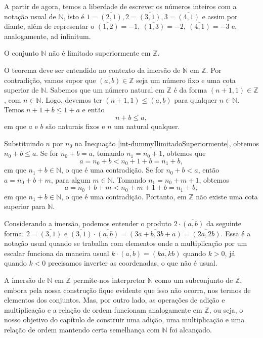\documentclass[../main.tex]{subfiles}
\begin{document}
\begin{obs}
    A partir de agora, temos a liberdade de escrever os números inteiros com a notação usual de $\mathbb{N}$, isto é $1 = \overline{(2,1)}, 2 = \overline{(3,1)}, 3 = \overline{(4,1)}$ e assim por diante, além de representar o $\overline{(1,2)} = -1,\ \overline{(1,3)} = -2,\ \overline{(4,1)} = -3$ e, analogamente, ad infinitum.
\end{obs}

\begin{teo}\label{int-teo-ilimitadoSuperiormente}
    O conjunto $\mathbb{N}$ não é limitado superiormente em $\mathbb{Z}$.
\end{teo}
\begin{dem}
    O teorema deve ser entendido no contexto da imersão de $\mathbb{N}$ em $\mathbb{Z}$.
    Por contradição, vamos supor que $\overline{(a,b)} \in \mathbb{Z}$ seja um número fixo e uma cota superior de $\mathbb{N}$. Sabemos que um número natural em $\mathbb{Z}$ é da forma $\overline{(n+1,1)} \in \mathbb{Z}$, com $n \in \mathbb{N}$. Logo, devemos ter $\overline{(n+1,1)} \leq \overline{(a,b)}$ para qualquer $n \in \mathbb{N}$. Temos $n+1+b \leq 1+a$ e então
    \begin{equation}
        n+b \leq a, \label{int-dummyIlimitadoSuperiormente}     
    \end{equation}
    em que $a$ e $b$ são naturais fixos e $n$ um natural qualquer.
    
    Substituindo $n$ por $n_0$ na Inequação \ref{int-dummyIlimitadoSuperiormente}, obtemos $n_0 + b \leq a$. Se for $n_0 + b = a$, tomando $n_1 = n_0 + 1$, obtemos que 
    \[ a = n_0 + b < n_0 + 1 + b =  n_1 + b, \] 
    em que $n_1 + b \in \mathbb{N}$, o que é uma contradição. Se for 
    $n_0 + b < a$, então $a = n_0 + b + m$, para algum $m \in \mathbb{N}$. Tomando $n_1 = n_0 + m + 1$, obtemos 
    \[ a = n_0 + b + m < n_0+m+1 + b = n_1 + b, \] 
    em que $n_1 + b \in \mathbb{N}$, o que é uma contradição. Portanto, em $\mathbb{Z}$ não existe uma cota superior para $\mathbb{N}$.

\end{dem}

\begin{ex}\label{int-ex-imersaoProduto}
    Considerando a imersão, podemos entender o produto $2 \cdot \overline{(a,b)}$ da seguinte forma:
    $2 = \overline{(3,1)}$ e $\overline{(3,1)} \cdot \overline{(a,b)} = \overline{(3a+b,3b+a)} = \overline{(2a,2b)}$.
    Essa é a notação usual quando se trabalha com elementos onde a multiplicação por um escalar funciona da maneira usual 
    $k \cdot \overline{(a,b)} = \overline{(ka,kb)}$ quando $k > 0$, já quando $k < 0$ precisamos inverter as coordenadas, o que não é usual.
\end{ex}
A imersão de $\mathbb{N}$ em $\mathbb{Z}$ permite-nos interpretar $\mathbb{N}$ como um subconjunto de $\mathbb{Z}$, embora pela nossa construção fique evidente que isso não ocorra, nos termos de elementos dos conjuntos. Mas, por outro lado, as operações de adição e multiplicação e a relação de ordem funcionam analogamente em $\mathbb{Z}$, ou seja, o nosso objetivo do capítulo de construir uma adição, uma multiplicação e uma relação de ordem mantendo certa semelhança com $\mathbb{N}$ foi alcançado.
\end{document}
